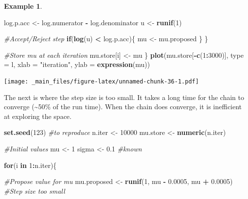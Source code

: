 \documentclass[
]{book}
\newenvironment{Shaded}{\begin{snugshade}}{\end{snugshade}}
\newcommand{\AttributeTok}[1]{\textcolor[rgb]{0.13,0.29,0.53}{#1}}
\newcommand{\CommentTok}[1]{\textcolor[rgb]{0.56,0.35,0.01}{\textit{#1}}}
\newcommand{\ControlFlowTok}[1]{\textcolor[rgb]{0.13,0.29,0.53}{\textbf{#1}}}
\newcommand{\DecValTok}[1]{\textcolor[rgb]{0.00,0.00,0.81}{#1}}
\newcommand{\FloatTok}[1]{\textcolor[rgb]{0.00,0.00,0.81}{#1}}
\newcommand{\FunctionTok}[1]{\textcolor[rgb]{0.13,0.29,0.53}{\textbf{#1}}}
\newcommand{\NormalTok}[1]{#1}
\newcommand{\OtherTok}[1]{\textcolor[rgb]{0.56,0.35,0.01}{#1}}
\newcommand{\SpecialCharTok}[1]{\textcolor[rgb]{0.81,0.36,0.00}{\textbf{#1}}}
\newcommand{\StringTok}[1]{\textcolor[rgb]{0.31,0.60,0.02}{#1}}
\theoremstyle{definition}
\theoremstyle{definition}
\newtheorem{example}{Example}[chapter]
\theoremstyle{definition}
\theoremstyle{definition}
\theoremstyle{remark}
\begin{document}
\begin{example}
\begin{Shaded}
\begin{Highlighting}[]
\NormalTok{    log.p.acc }\OtherTok{\textless{}{-}}\NormalTok{ log.numerator }\SpecialCharTok{{-}}\NormalTok{ log.denominator}
\NormalTok{    u }\OtherTok{\textless{}{-}} \FunctionTok{runif}\NormalTok{(}\DecValTok{1}\NormalTok{)}
    
    \CommentTok{\#Accept/Reject step}
    \ControlFlowTok{if}\NormalTok{(}\FunctionTok{log}\NormalTok{(u) }\SpecialCharTok{\textless{}}\NormalTok{ log.p.acc)\{}
\NormalTok{      mu }\OtherTok{\textless{}{-}}\NormalTok{ mu.proposed}
\NormalTok{    \}}
\NormalTok{  \}}
  
  \CommentTok{\#Store mu at each iteration}
\NormalTok{  mu.store[i] }\OtherTok{\textless{}{-}}\NormalTok{ mu}
\NormalTok{\}}
\FunctionTok{plot}\NormalTok{(mu.store[}\SpecialCharTok{{-}}\FunctionTok{c}\NormalTok{(}\DecValTok{1}\SpecialCharTok{:}\DecValTok{3000}\NormalTok{)], }\AttributeTok{type =} \StringTok{\textquotesingle{}l\textquotesingle{}}\NormalTok{, }\AttributeTok{xlab =} \StringTok{"iteration"}\NormalTok{, }
     \AttributeTok{ylab =} \FunctionTok{expression}\NormalTok{(mu))}
\end{Highlighting}
\end{Shaded}

\texttt{[image: \_main\_files/figure-latex/unnamed-chunk-36-1.pdf]}

The next is where the step size is too small. It takes a long time for the chain to converge (\textasciitilde50\% of the run time). When the chain does converge, it is inefficient at exploring the space.

\begin{Shaded}
\begin{Highlighting}[]
\FunctionTok{set.seed}\NormalTok{(}\DecValTok{123}\NormalTok{) }\CommentTok{\#to reproduce}
\NormalTok{n.iter   }\OtherTok{\textless{}{-}} \DecValTok{10000}
\NormalTok{mu.store }\OtherTok{\textless{}{-}} \FunctionTok{numeric}\NormalTok{(n.iter)}

\CommentTok{\#Initial values}
\NormalTok{mu }\OtherTok{\textless{}{-}} \DecValTok{1} 
\NormalTok{sigma }\OtherTok{\textless{}{-}} \FloatTok{0.1} \CommentTok{\#known}

\ControlFlowTok{for}\NormalTok{(i }\ControlFlowTok{in} \DecValTok{1}\SpecialCharTok{:}\NormalTok{n.iter)\{}
  
  \CommentTok{\#Propose value for mu}
\NormalTok{  mu.proposed }\OtherTok{\textless{}{-}} \FunctionTok{runif}\NormalTok{(}\DecValTok{1}\NormalTok{, mu }\SpecialCharTok{{-}} \FloatTok{0.0005}\NormalTok{, mu }\SpecialCharTok{+} \FloatTok{0.0005}\NormalTok{) }\CommentTok{\#Step size too small}
  

\end{Highlighting}
\end{Shaded}
\end{example}
\end{document}
